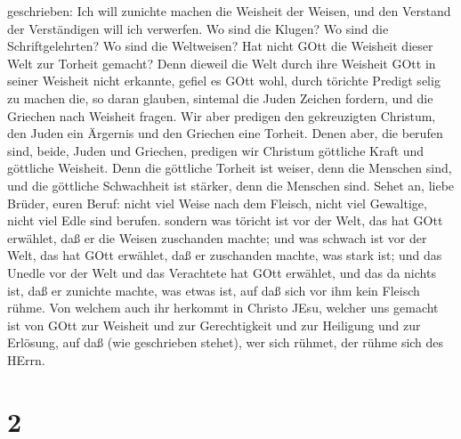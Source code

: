 geschrieben: Ich will zunichte machen die Weisheit der Weisen, und den
Verstand der Verständigen will ich verwerfen.  Wo sind die
Klugen? Wo sind die Schriftgelehrten? Wo sind die Weltweisen? Hat nicht
GOtt die Weisheit dieser Welt zur Torheit gemacht?  Denn
dieweil die Welt durch ihre Weisheit GOtt in seiner Weisheit nicht
erkannte, gefiel es GOtt wohl, durch törichte Predigt selig zu machen
die, so daran glauben,  sintemal die Juden Zeichen fordern,
und die Griechen nach Weisheit fragen.  Wir aber predigen
den gekreuzigten Christum, den Juden ein Ärgernis und den Griechen eine
Torheit.  Denen aber, die berufen sind, beide, Juden und
Griechen, predigen wir Christum göttliche Kraft und göttliche Weisheit.
 Denn die göttliche Torheit ist weiser, denn die Menschen
sind, und die göttliche Schwachheit ist stärker, denn die Menschen sind.
 Sehet an, liebe Brüder, euren Beruf: nicht viel Weise nach
dem Fleisch, nicht viel Gewaltige, nicht viel Edle sind berufen.
 sondern was töricht ist vor der Welt, das hat GOtt
erwählet, daß er die Weisen zuschanden machte; und was schwach ist vor
der Welt, das hat GOtt erwählet, daß er zuschanden machte, was stark
ist;  und das Unedle vor der Welt und das Verachtete hat
GOtt erwählet, und das da nichts ist, daß er zunichte machte, was etwas
ist,  auf daß sich vor ihm kein Fleisch rühme.
 Von welchem auch ihr herkommt in Christo JEsu, welcher uns
gemacht ist von GOtt zur Weisheit und zur Gerechtigkeit und zur
Heiligung und zur Erlösung,  auf daß (wie geschrieben
stehet), wer sich rühmet, der rühme sich des HErrn.

\hypertarget{section-1}{%
\section{2}\label{section-1}}


